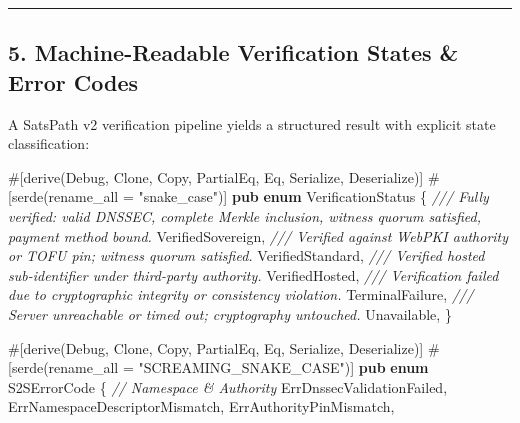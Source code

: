 \documentclass[
]{article}
\newenvironment{Shaded}{}{}
\newcommand{\AttributeTok}[1]{\textcolor[rgb]{0.49,0.56,0.16}{#1}}
\newcommand{\BuiltInTok}[1]{\textcolor[rgb]{0.00,0.50,0.00}{#1}}
\newcommand{\CommentTok}[1]{\textcolor[rgb]{0.38,0.63,0.69}{\textit{#1}}}
\newcommand{\KeywordTok}[1]{\textcolor[rgb]{0.00,0.44,0.13}{\textbf{#1}}}
\newcommand{\NormalTok}[1]{#1}
\newcommand{\OperatorTok}[1]{\textcolor[rgb]{0.40,0.40,0.40}{#1}}
\newcommand{\StringTok}[1]{\textcolor[rgb]{0.25,0.44,0.63}{#1}}
\begin{document}
\begin{center}\rule{0.5\linewidth}{0.5pt}\end{center}

\hypertarget{machine-readable-verification-states-error-codes}{%
\subsection{5. Machine-Readable Verification States \& Error
Codes}\label{machine-readable-verification-states-error-codes}}

A SatsPath v2 verification pipeline yields a structured result with
explicit state classification:

\begin{Shaded}
\begin{Highlighting}[]
\AttributeTok{\#[}\NormalTok{derive}\AttributeTok{(}\BuiltInTok{Debug}\OperatorTok{,} \BuiltInTok{Clone}\OperatorTok{,} \BuiltInTok{Copy}\OperatorTok{,} \BuiltInTok{PartialEq}\OperatorTok{,} \BuiltInTok{Eq}\OperatorTok{,}\NormalTok{ Serialize}\OperatorTok{,}\NormalTok{ Deserialize}\AttributeTok{)]}
\AttributeTok{\#[}\NormalTok{serde}\AttributeTok{(}\NormalTok{rename\_all }\OperatorTok{=} \StringTok{"snake\_case"}\AttributeTok{)]}
\KeywordTok{pub} \KeywordTok{enum}\NormalTok{ VerificationStatus }\OperatorTok{\{}
    \CommentTok{/// Fully verified: valid DNSSEC, complete Merkle inclusion, witness quorum satisfied, payment method bound.}
\NormalTok{    VerifiedSovereign}\OperatorTok{,}
    \CommentTok{/// Verified against WebPKI authority or TOFU pin; witness quorum satisfied.}
\NormalTok{    VerifiedStandard}\OperatorTok{,}
    \CommentTok{/// Verified hosted sub{-}identifier under third{-}party authority.}
\NormalTok{    VerifiedHosted}\OperatorTok{,}
    \CommentTok{/// Verification failed due to cryptographic integrity or consistency violation.}
\NormalTok{    TerminalFailure}\OperatorTok{,}
    \CommentTok{/// Server unreachable or timed out; cryptography untouched.}
\NormalTok{    Unavailable}\OperatorTok{,}
\OperatorTok{\}}

\AttributeTok{\#[}\NormalTok{derive}\AttributeTok{(}\BuiltInTok{Debug}\OperatorTok{,} \BuiltInTok{Clone}\OperatorTok{,} \BuiltInTok{Copy}\OperatorTok{,} \BuiltInTok{PartialEq}\OperatorTok{,} \BuiltInTok{Eq}\OperatorTok{,}\NormalTok{ Serialize}\OperatorTok{,}\NormalTok{ Deserialize}\AttributeTok{)]}
\AttributeTok{\#[}\NormalTok{serde}\AttributeTok{(}\NormalTok{rename\_all }\OperatorTok{=} \StringTok{"SCREAMING\_SNAKE\_CASE"}\AttributeTok{)]}
\KeywordTok{pub} \KeywordTok{enum}\NormalTok{ S2SErrorCode }\OperatorTok{\{}
    \CommentTok{// Namespace \& Authority}
\NormalTok{    ErrDnssecValidationFailed}\OperatorTok{,}
\NormalTok{    ErrNamespaceDescriptorMismatch}\OperatorTok{,}
\NormalTok{    ErrAuthorityPinMismatch}\OperatorTok{,}


\end{Highlighting}
\end{Shaded}
\end{document}
